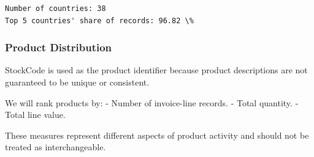 \documentclass[11pt]{article}
\begin{document}
    
    \begin{Verbatim}[commandchars=\\\{\}]
Number of countries: 38
Top 5 countries' share of records: 96.82 \%
    \end{Verbatim}

    \subsubsection{Product Distribution}\label{product-distribution}

StockCode is used as the product identifier because product descriptions
are not guaranteed to be unique or consistent.

We will rank products by: - Number of invoice-line records. - Total
quantity. - Total line value.

These measures represent different aspects of product activity and
should not be treated as interchangeable.
\end{document}
